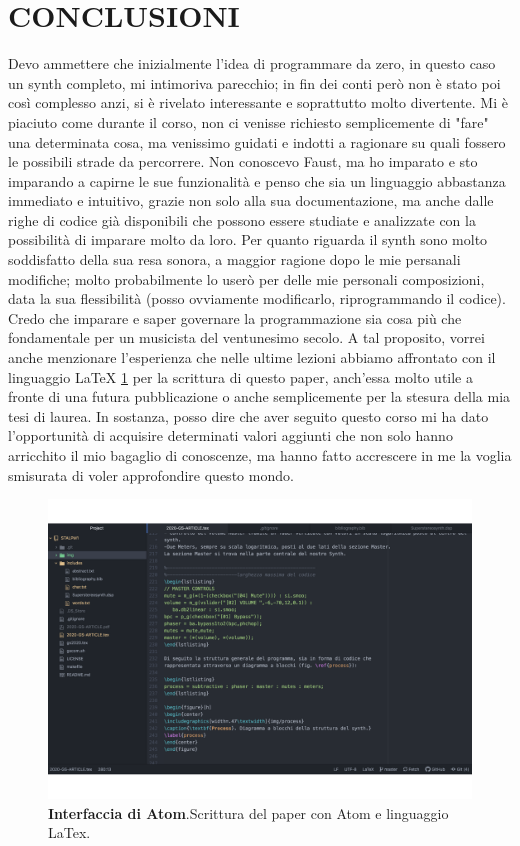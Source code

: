 \documentclass[
	a4paper,
	twocolumn
	]{article}
\begin{document}
\section*{CONCLUSIONI}
Devo ammettere che inizialmente l'idea di programmare da zero,
in questo caso un synth completo, mi intimoriva parecchio; in fin dei conti
però non è stato poi così complesso anzi, si è rivelato interessante e soprattutto
molto divertente. Mi è piaciuto come durante il corso, non ci venisse richiesto semplicemente
di "fare" una determinata cosa, ma venissimo guidati e indotti a ragionare su quali
fossero le possibili strade da percorrere. Non conoscevo Faust, ma ho imparato e sto imparando a
capirne le sue funzionalità e penso che sia un linguaggio abbastanza immediato e intuitivo,
grazie non solo alla sua documentazione, ma anche dalle righe di codice già disponibili che
possono essere studiate e analizzate con la possibilità di imparare molto da loro. Per quanto riguarda il synth
sono molto soddisfatto della sua resa sonora, a maggior ragione dopo le mie persanali modifiche; molto
probabilmente lo userò per delle mie personali composizioni, data la sua flessibilità
(posso ovviamente modificarlo, riprogrammando il codice). Credo che imparare e saper
governare la programmazione sia cosa più che fondamentale per un musicista del ventunesimo secolo.
A tal proposito, vorrei anche menzionare l'esperienza che nelle ultime lezioni abbiamo
affrontato con il linguaggio LaTeX \ref{latex} per la scrittura di questo paper, anch'essa molto utile a fronte
di una futura pubblicazione o anche semplicemente per la stesura
della mia tesi di laurea. In sostanza, posso dire che aver seguito questo corso mi ha dato l'opportunità di
acquisire determinati valori aggiunti che non solo hanno arricchito il mio bagaglio di conoscenze,
ma hanno fatto accrescere in me la voglia smisurata di voler approfondire questo mondo.

\begin{figure}[h]
\begin{center}
\includegraphics[width=.47\textwidth]{img/latex}
\caption{\textbf{Interfaccia di Atom}.Scrittura del paper con Atom e linguaggio LaTex.}
\label{latex}
\end{center}
\end{figure}
\end{document}
